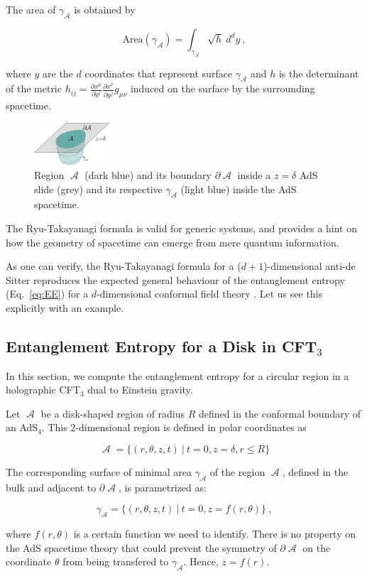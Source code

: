 \documentclass[twocolumn]{revtex4}
\providecommand{\eq}[2]{
    \begin{equation}
        #2
    \label{eq:#1}
    \end{equation}
}
\DeclareMathOperator{\calA}{\mathcal{A}}
\begin{document}
The area of $\gamma_{\calA}$ is obtained by
\eq{EE_RT-area}{
    \text{Area}(\gamma_{\calA}) = \int_{\gamma_{\calA}} \sqrt{h} \ d^{d}y \ ,
}
where $y$ are the $d$ coordinates that represent surface $\gamma_{\calA}$ and $h$ is the determinant of the metric $h_{ij} = \frac{\partial x^\mu}{\partial y^i} \frac{\partial x^\nu}{\partial y^j} g_{\mu\nu}$ induced on the surface by the surrounding spacetime.

\begin{figure}
    \centering
    \includegraphics[width=0.25\textwidth]{../Imatges/EE_AdS-CFT.png}
\caption{Region $\calA$ (dark blue) and its boundary $\partial \calA$ inside a $z=\delta$ AdS slide (grey) and its respective $\gamma_{\calA}$ (light blue) inside the AdS spacetime.}
\label{fig:EE_AdS-CFT}
\end{figure}

The Ryu-Takayanagi formula is valid for generic systems, and provides a hint on how the geometry of spacetime can emerge from mere quantum information. 

As one can verify, the Ryu-Takayanagi formula for a ($d+1$)-dimensional anti-de Sitter reproduces the expected general behaviour of the entanglement entropy (Eq.~\ref{eq:EE}) for a $d$-dimensional conformal field theory \cite{}. Let us see this explicitly with an example.


\subsection{Entanglement Entropy for a Disk in CFT$_3$} \label{ss:EE-disk}

In this section, we compute the entanglement entropy for a circular region in a holographic CFT$_3$ dual to Einstein gravity.

Let $\calA$ be a disk-shaped region of radius $R$ defined in the conformal boundary of an AdS$_4$. This 2-dimensional region is defined in polar coordinates as
\eq{1A}{
    \calA = \{ ( r, \theta, z, t ) \ | \ t = 0, z = \delta, r \le R \}
}
The corresponding surface of minimal area $\gamma_{\calA}$ of the region $\calA$, defined in the bulk and adjacent to $\partial \calA$, is parametrized as:
\eq{1gA}{
    \gamma_{\calA} = \{ ( r, \theta, z, t ) \ | \ t = 0, z = f (r, \theta) \} \ ,
}
where $f(r,\theta)$ is a certain function we need to identify. There is no property on the AdS spacetime theory that could prevent the symmetry of $\partial \calA$ on the coordinate $\theta$ from being transfered to $\gamma_{\calA}$. Hence, $z=f(r)$.
\end{document}
